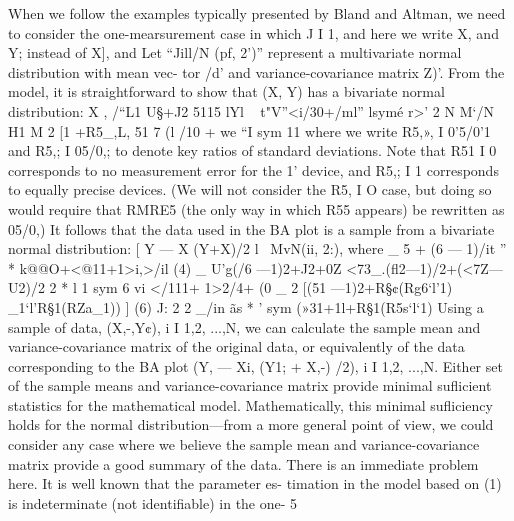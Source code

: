 When we follow the examples typically presented by Bland and Altman, we need
to consider the one-mearsurement case in which J I 1, and here we write X, and Y;
instead of X], and 
Let “Jill/N (pf, 2')” represent a multivariate normal distribution with mean vec-
tor /d' and variance-covariance matrix Z)’. From the model, it is straightforward to
show that (X, Y) has a bivariate normal distribution:
X , /“L1 U§+J2 5115
lYl ~ t"V”<i/30+/ml” lsymé r>’%
2
N M‘/N H1 M 2 [1 +R5_,L, 51 7
(l /10 + we “I sym 11%
where we write R5,», I 0'5/0'1 and R5,; I 05/0,; to denote key ratios of standard
deviations. Note that R51 I 0 corresponds to no measurement error for the 1' device,
and R5,; I 1 corresponds to equally precise devices. (We will not consider the R5, I O
case, but doing so would require that RMRE5 (the only way in which R55 appears) be
rewritten as 05/0,)
It follows that the data used in the BA plot is a sample from a bivariate normal
distribution:
[ Y — X
(Y+X)/2 l ~MvN(ii, 2:),
where
_ 5 + (6 — 1)/it
” * k@@O+<@11+1>i,>/il (4)
_ U'g(/6 —1)2+J2+0Z <73_.(ﬂ2—1)/2+(<7Z—U2)/2
2 * l 1 sym 6 vi </111+ 1>2/4+ (0%
_ 2 [(51 —1)2+R§¢(Rg6‘l'1)  _1‘l'R§1(RZa_1)) ] (6)
J: 2 2
\_/in
\~
as
* ' sym (»31+1l+R§1(R5s‘l‘1)
Using a sample of data, (X,-,Y¢), i I 1,2, ...,N, we can calculate the sample
mean and variance-covariance matrix of the original data, or equivalently of the data
corresponding to the BA plot (Y, — Xi, (Y1; + X,-) /2), i I 1,2, ...,N. Either set of
the sample means and variance-covariance matrix provide minimal suﬂicient statistics
for the mathematical model. Mathematically, this minimal suﬂiciency holds for the
normal distribution—from a more general point of view, we could consider any case
where we believe the sample mean and variance-covariance matrix provide a good
summary of the data.
There is an immediate problem here. It is well known that the parameter es-
timation in the model based on (1) is indeterminate (not identiﬁable) in the one-
5



